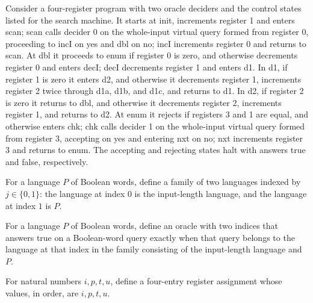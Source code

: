 \begin{definition}
\label{Complexity.LogProg.WidthExample.searchA}
\leanok
{}
Consider a four-register program with two oracle deciders and the control states listed
for the search machine. It starts at init, increments register 1 and enters scan; scan
calls decider 0 on the whole-input virtual query formed from register 0, proceeding to
incI on yes and dbl on no; incI increments register 0 and returns to scan. At dbl it
proceeds to enum if register 0 is zero, and otherwise decrements register 0 and enters
decI; decI decrements register 1 and enters d1. In d1, if register 1 is zero it enters
d2, and otherwise it decrements register 1, increments register 2 twice through d1a,
d1b, and d1c, and returns to d1. In d2, if register 2 is zero it returns to dbl, and
otherwise it decrements register 2, increments register 1, and returns to d2. At enum it
rejects if registers 3 and 1 are equal, and otherwise enters chk; chk calls decider 1 on
the whole-input virtual query formed from register 3, accepting on yes and entering nxt
on no; nxt increments register 3 and returns to enum. The accepting and rejecting states
halt with answers true and false, respectively.
\end{definition}

\begin{definition}
\label{Complexity.LogProg.WidthExample.decs}
\leanok
{}
For a language $P$ of Boolean words, define a family of two languages indexed by
$j\in\{0,1\}$: the language at index $0$ is the input-length language, and the language
at index $1$ is $P$.
\end{definition}

\begin{definition}
\label{Complexity.LogProg.WidthExample.orc}
\leanok
{}
For a language $P$ of Boolean words, define an oracle with two indices that answers true
on a Boolean-word query exactly when that query belongs to the language at that index in
the family consisting of the input-length language and $P$.
\end{definition}

\begin{definition}
\label{Complexity.LogProg.WidthExample.rf}
\leanok
For natural numbers $i,p,t,u$, define a four-entry register assignment whose values, in
order, are $i,p,t,u$.
\end{definition}

